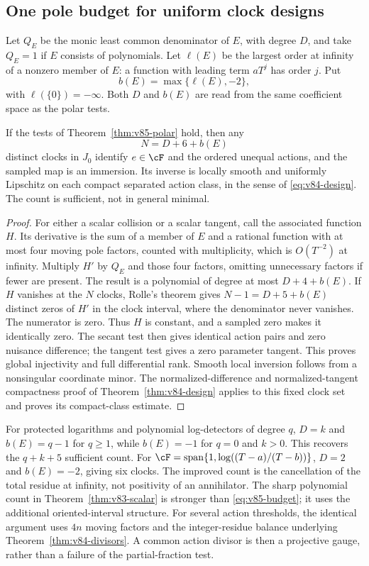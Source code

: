 \subsection{One pole budget for uniform clock designs}
Let $Q_E$ be the monic least common denominator of $E$, with degree
$D$, and take $Q_E=1$ if $E$ consists of polynomials. Let $\ell(E)$
be the largest order at infinity of a nonzero member of $E$: a
function with leading term $aT^j$ has order $j$. Put
\[
                  b(E)=\max\{\ell(E),-2\},
\]
with $\ell(\{0\})=-\infty$. Both $D$ and $b(E)$ are read from the
same coefficient space as the polar tests.

\begin{theorem}\label{thm:v85-budget}
If the tests of Theorem~\ref{thm:v85-polar} hold, then any
\begin{equation}\label{eq:v85-budget}
                         N=D+6+b(E)
\end{equation}
distinct clocks in $J_0$ identify $e\in\cF$ and the ordered unequal
actions, and the sampled map is an immersion. Its inverse is locally
smooth and uniformly Lipschitz on each compact separated action class,
in the sense of \eqref{eq:v84-design}. The count is sufficient, not
in general minimal.
\end{theorem}
\begin{proof}
For either a scalar collision or a scalar tangent, call the associated
function $H$. Its derivative is the sum of a member of $E$ and a
rational function with at most four moving pole factors, counted with
multiplicity, which is $O(T^{-2})$ at infinity. Multiply $H'$ by
$Q_E$ and those four factors, omitting unnecessary factors if fewer
are present. The result is a polynomial of degree at most
$D+4+b(E)$. If $H$ vanishes at the $N$ clocks, Rolle's theorem gives
$N-1=D+5+b(E)$ distinct zeros of $H'$ in the clock interval, where
the denominator never vanishes. The numerator is zero. Thus $H$ is
constant, and a sampled zero makes it identically zero. The secant
test then gives identical action pairs and zero nuisance difference;
the tangent test gives a zero parameter tangent. This proves global
injectivity and full differential rank. Smooth local inversion follows
from a nonsingular coordinate minor. The normalized-difference and
normalized-tangent compactness proof of Theorem~\ref{thm:v84-design}
applies to this fixed clock set and proves its compact-class estimate.
\end{proof}
For protected logarithms and polynomial log-detectors of degree $q$,
$D=k$ and $b(E)=q-1$ for $q\ge1$, while $b(E)=-1$ for $q=0$ and
$k>0$. This recovers the $q+k+5$ sufficient count. For
$\cF=\operatorname{span}\{1,\log((T-a)/(T-b))\}$, $D=2$ and
$b(E)=-2$, giving six clocks. The improved count is the cancellation
of the total residue at infinity, not positivity of an annihilator.
The sharp polynomial count in Theorem~\ref{thm:v83-scalar} is stronger
than \eqref{eq:v85-budget}; it uses the additional oriented-interval
structure. For several action thresholds, the identical argument uses
$4n$ moving factors and the integer-residue balance underlying
Theorem~\ref{thm:v84-divisors}. A common action divisor is then a
projective gauge, rather than a failure of the partial-fraction test.

